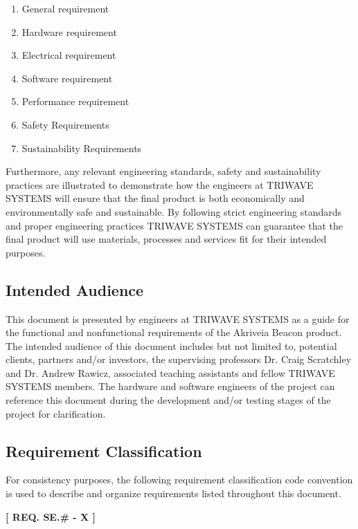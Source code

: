 \begin{enumerate}
	\item General requirement
	\item Hardware requirement
	\item Electrical requirement
	\item Software requirement
	\item Performance requirement
	\item Safety Requirements
	\item Sustainability  Requirements
\end{enumerate}
\medskip
Furthermore, any relevant engineering standards, safety and sustainability practices are illustrated to demonstrate how the engineers at TRIWAVE SYSTEMS will ensure that the final product is both economically and environmentally safe and sustainable. By following strict engineering standards and proper engineering practices TRIWAVE SYSTEMS can guarantee that the final product will use materials, processes and services fit for their intended purposes.

\bigskip
\subsection{Intended Audience}
This document is presented by engineers at TRIWAVE SYSTEMS as a guide for the functional and nonfunctional requirements of the Akriveia Beacon product. The intended audience of this document includes but not limited to, potential clients, partners and/or investors, the supervising professors Dr. Craig Scratchley and Dr. Andrew Rawicz, associated teaching assistants and fellow TRIWAVE SYSTEMS members. The hardware and software engineers of the project can reference this document during the development and/or testing stages of the project for clarification.

\break

\subsection{Requirement Classification}
\bigskip
For consistency purposes, the following requirement classification code convention is used to describe and organize requirements listed throughout this document.
\begin{center}
\bigskip
	\textbf{[ REQ. SE.\# - X ]}
\end{center}

